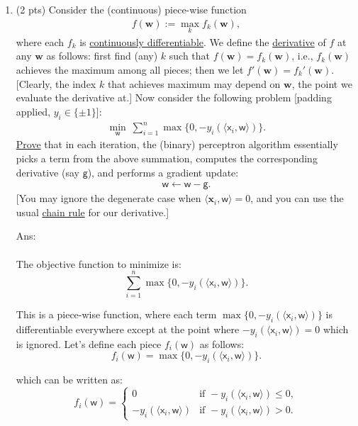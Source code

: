 \documentclass[10pt]{article}
\newcommand{\wv}{\mathbf{w}}
\newcommand{\xv}{\mathbf{x}}
\newcommand{\inner}[2]{\langle #1, #2 \rangle}
\newcommand{\xbs}{\bm{\mathsf{x}}}
\newcommand{\wbs}{\bm{\mathsf{w}}}
\newcommand{\gbs}{\bm{\mathsf{g}}}
\newcommand{\ie}{{i.e.}\xspace}
\newcommand{\ans}[1]{{\color{orange}\textsf{Ans}: #1}}
\begin{document}
\begin{exercise}
\begin{enumerate}
    \item (2 pts) Consider the (continuous) piece-wise function
          \begin{align}
            f(\wv) := \max_k f_k(\wv),
          \end{align}
          where each $f_k$ is \href{https://en.wikipedia.org/wiki/Differentiable_function}{continuously differentiable}.
          We define the \href{https://en.wikipedia.org/wiki/Subderivative}{derivative} of $f$ at any $\wv$ as follows: first find (any) $k$ such that $f(\wv) = f_k(\wv)$, \ie, $f_k(\wv)$ achieves the maximum among all pieces; then we let $f'(\wv) = f_k'(\wv)$. [Clearly, the index $k$ that achieves maximum may depend on $\wv$, the point we evaluate the derivative at.] Now consider the following problem [padding applied, $y_i \in \{\pm1\}$]:
          \begin{align}
            \label{eq:bp}
            \min_{\wbs} ~ \sum_{i=1}^n \max\{ 0, -y_i (\inner{\xbs_i}{\wbs}) \}.
          \end{align}
          \uline{Prove} that in each iteration, the (binary) perceptron algorithm essentially picks a term from the above summation, computes the corresponding derivative (say $\gbs$), and performs a gradient update:
          \begin{align}
            \wbs \gets \wbs - \gbs.
          \end{align}
          [You may ignore the degenerate case when $\inner{\xv_i}{\wbs} = 0$, and you can use  the usual \href{https://en.wikipedia.org/wiki/Chain_rule}{chain rule} for our derivative.]

          \ans\\
          \leavevmode\\
          The objective function to minimize is:
          $$
            \sum_{i=1}^n \max\{ 0, -y_i (\inner{\xbs_i}{\wbs}) \}.
          $$

          This is a piece-wise function, where each term $\max\{ 0, -y_i (\inner{\xbs_i}{\wbs}) \}$ is differentiable everywhere except at the point where $-y_i (\inner{\xbs_i}{\wbs}) = 0$ which is ignored. Let's define each piece $f_i(\wbs)$ as follows:
          $$
            f_i(\wbs) = \max\{ 0, -y_i (\inner{\xbs_i}{\wbs}) \}.
          $$

          which can be written as:
          $$
            f_i(\wbs) =
            \begin{cases}
              0                           & \text{if } -y_i (\inner{\xbs_i}{\wbs}) \le 0, \\
              -y_i (\inner{\xbs_i}{\wbs}) & \text{if } -y_i (\inner{\xbs_i}{\wbs}) > 0.
            \end{cases}
          $$


\end{enumerate}
\end{exercise}
\end{document}

